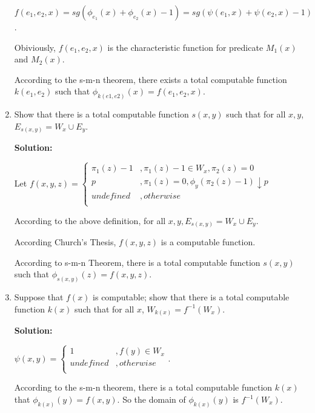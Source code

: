 \documentclass[12pt,a4paper]{article}
\theoremstyle{definition}
\numberwithin{equation}{section}
\numberwithin{figure}{section}
\begin{document}
\begin{enumerate}
$f(e_1,e_2,x)=sg(\phi_{e_1}(x)+\phi_{e_2}(x)−1)=sg(\psi(e_1,x)+\psi(e_2,x)-1)$.

Obiviously, $f(e_1,e_2,x)$ is the characteristic function for predicate $M_1(x)$ and $M_2(x)$.

According to the s-m-n theorem, there exists a total computable function $k(e_1,e_2)$ such that $\phi_{k(e1,e2)}(x) = f(e_1, e_2, x)$.

\item Show that there is a total computable function $s(x,y)$ such that for all $x,y$, $E_{s(x,y)}=W_x \cup E_y$.

\textbf{Solution:}

Let $f(x,y,z) =  \begin{cases} \pi_1(z)-1 & ,\pi_1(z) - 1 \in W_x, \pi_2(z)=0 \\ 
p &, \pi_1(z) = 0, \phi_{y}(\pi_2(z)-1) \downarrow p \\
undefined &, otherwise\\
\end{cases}$

According to the above definition, for all $x, y, E_{s(x,y)} = W_x \cup E_y$.
 
According Church’s Thesis, $f(x,y,z)$ is a computable function. 

According to s-m-n Theorem, there is a total computable function $s(x, y)$ such that $\phi_{s(x,y)}(z) = f(x, y, z)$.


\item Suppose that $f(x)$ is computable; show that there is a total computable function $k(x)$ such that for all $x$, $W_{k(x)}=f^{-1}(W_x)$.

\textbf{Solution:}

$ \psi(x, y) = \begin{cases}  1 &, f(y) \in W_x \\ undefined &, otherwise \\ \end{cases}$.

According to the s-m-n theorem, there is a total computable function $k(x)$ that $\phi_{k(x)}(y) = f(x,y)$. So the domain of $\phi_{k(x)}(y)$ is $f^{-1}(W_x)$.

\end{enumerate}



\end{document}
